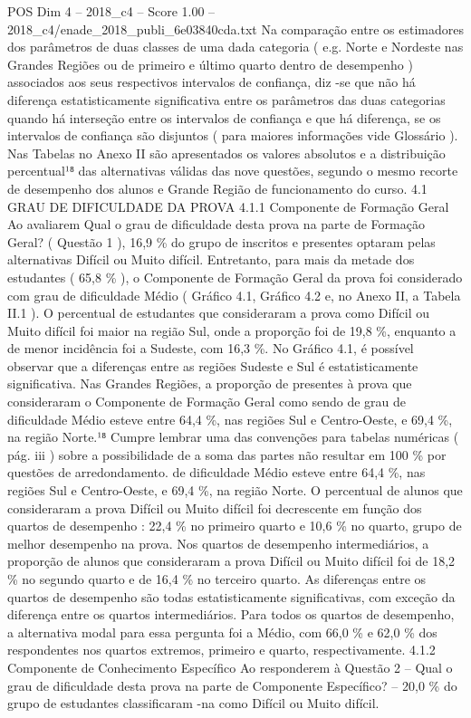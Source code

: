 \begin{textsample}{POS Dim 4 – 2018\_c4 – Score 1.00 – 2018\_c4/enade\_2018\_publi\_6e03840cda.txt}
Na comparação entre os estimadores dos parâmetros de duas classes de uma dada categoria ( e.g.
Norte e Nordeste nas Grandes Regiões ou de primeiro e último quarto dentro de desempenho ) associados aos seus respectivos intervalos de confiança, diz -se que não há diferença estatisticamente significativa entre os parâmetros das duas categorias quando há interseção entre os intervalos de confiança e que há diferença, se os intervalos de confiança são disjuntos ( para maiores informações vide Glossário ).
Nas Tabelas no Anexo II são apresentados os valores absolutos e a distribuição percentual¹⁸ das alternativas válidas das nove questões, segundo o mesmo recorte de desempenho dos alunos e Grande Região de funcionamento do curso. 4.1 GRAU DE DIFICULDADE DA PROVA 4.1.1 Componente de Formação Geral Ao avaliarem Qual o grau de dificuldade desta prova na parte de Formação Geral? ( Questão 1 ), 16,9 \% do grupo de inscritos e presentes optaram pelas alternativas Difícil ou Muito difícil.
Entretanto, para mais da metade dos estudantes ( 65,8 \% ), o Componente de Formação Geral da prova foi considerado com grau de dificuldade Médio ( Gráfico 4.1, Gráfico 4.2 e, no Anexo II, a Tabela II.1 ).
O percentual de estudantes que consideraram a prova como Difícil ou Muito difícil foi maior na região Sul, onde a proporção foi de 19,8 \%, enquanto a de menor incidência foi a Sudeste, com 16,3 \%.
No Gráfico 4.1, é possível observar que a diferenças entre as regiões Sudeste e Sul é estatisticamente significativa.
Nas Grandes Regiões, a proporção de presentes à prova que consideraram o Componente de Formação Geral como sendo de grau de dificuldade Médio esteve entre 64,4 \%, nas regiões Sul e Centro-Oeste, e 69,4 \%, na região Norte.¹⁸ Cumpre lembrar uma das convenções para tabelas numéricas ( pág. iii ) sobre a possibilidade de a soma das partes não resultar em 100 \% por questões de arredondamento. de dificuldade Médio esteve entre 64,4 \%, nas regiões Sul e Centro-Oeste, e 69,4 \%, na região Norte.
O percentual de alunos que consideraram a prova Difícil ou Muito difícil foi decrescente em função dos quartos de desempenho : 22,4 \% no primeiro quarto e 10,6 \% no quarto, grupo de melhor desempenho na prova.
Nos quartos de desempenho intermediários, a proporção de alunos que consideraram a prova Difícil ou Muito difícil foi de 18,2 \% no segundo quarto e de 16,4 \% no terceiro quarto.
As diferenças entre os quartos de desempenho são todas estatisticamente significativas, com exceção da diferença entre os quartos intermediários.
Para todos os quartos de desempenho, a alternativa modal para essa pergunta foi a Médio, com 66,0 \% e 62,0 \% dos respondentes nos quartos extremos, primeiro e quarto, respectivamente. 4.1.2 Componente de Conhecimento Específico Ao responderem à Questão 2 – Qual o grau de dificuldade desta prova na parte de Componente Específico? – 20,0 \% do grupo de estudantes classificaram -na como Difícil ou Muito difícil.

\end{textsample}
